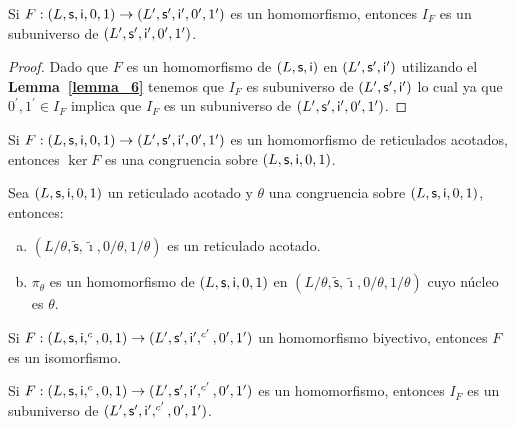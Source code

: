   \begin{lemma}
    \PN Si $F: (L, \mathsf{s}, \mathsf{i}, 0, 1) \rightarrow (L^{\prime}, \mathsf{s}^{\prime}, \mathsf{i}^{\prime}, 0^{\prime}, 1^{\prime})$ es un
    homomorfismo, entonces $I_{F}$ es un subuniverso de $(L^{\prime}, \mathsf{s}^{\prime}, \mathsf{i}^{\prime}, 0^{\prime},
    1^{\prime})$.
  \end{lemma}
  \begin{proof}
    \PN Dado que $F$ es un homomorfismo de $(L, \mathsf{s}, \mathsf{i})$ en $ (L^{\prime}, \mathsf{s}^{\prime}, \mathsf{i}^{\prime})$ utilizando el
    \textbf{Lemma~\ref{lemma_6}} tenemos que $I_{F}$ es subuniverso de $(L^{\prime}, \mathsf{s}^{\prime}, \mathsf{i}^{\prime})$ lo
    cual ya que $0^{\prime}, 1^{\prime} \in I_{F}$ implica que $I_{F}$ es un subuniverso de $(L^{\prime}, \mathsf{s}^{\prime},
    \mathsf{i}^{\prime}, 0^{\prime}, 1^{\prime})$.
  \end{proof}

  \begin{lemma}
    \PN Si $F: (L, \mathsf{s}, \mathsf{i}, 0, 1) \rightarrow (L^{\prime}, \mathsf{s}^{\prime}, \mathsf{i}^{\prime},
    0^{\prime}, 1^{\prime})$ es un homomorfismo de reticulados acotados, entonces $\ker F$ es una congruencia sobre $(L,
    \mathsf{s}, \mathsf{i}, 0, 1)$.
  \end{lemma}

  \begin{lemma}
    \PN Sea $(L, \mathsf{s}, \mathsf{i}, 0, 1)$ un reticulado acotado y $\theta$ una congruencia sobre $(L, \mathsf{s}, \mathsf{i}, 0, 1)$, entonces:
    \begin{enumerate}[a)]
      \item $(L/\theta, \mathsf{\tilde{s}}, \mathsf{\tilde{\imath}}, 0/\theta, 1/\theta)$ es un reticulado acotado.
      \item $\pi_{\theta}$ es un homomorfismo de $(L, \mathsf{s}, \mathsf{i}, 0, 1)$ en $(L/\theta, \mathsf{\tilde{s}},
        \mathsf{\tilde{\imath}}, 0/\theta, 1/\theta)$ cuyo núcleo es $\theta$.
    \end{enumerate}
  \end{lemma}

  \begin{lemma}
    \PN Si $F:(L, \mathsf{s}, \mathsf{i}, ^{c}, 0, 1) \rightarrow (L^{\prime}, \mathsf{s}^{\prime}, \mathsf{i}^{\prime}, ^{c^{\prime}}, 0^{\prime},
    1^{\prime})$ un homomorfismo biyectivo, entonces $F$ es un isomorfismo.
  \end{lemma}

  \begin{lemma}
    \PN Si $F: (L, \mathsf{s}, \mathsf{i}, ^{c}, 0, 1) \rightarrow (L^{\prime}, \mathsf{s}^{\prime}, \mathsf{i}^{\prime}, ^{c^{\prime}}, 0^{\prime},
    1^{\prime})$ es un homomorfismo, entonces $I_{F}$ es un subuniverso de $(L^{\prime}, \mathsf{s}^{\prime}, \mathsf{i}^{\prime},
    ^{c^{\prime}}, 0^{\prime}, 1^{\prime})$.
  \end{lemma}

